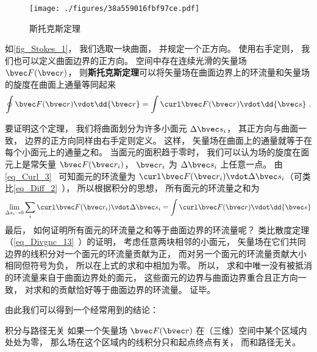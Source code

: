 
\begin{issues}
\issueTODO
\end{issues}


\begin{figure}[ht]
\centering
\texttt{[image: ./figures/38a559016fbf97ce.pdf]}
\caption{斯托克斯定理} \label{fig_Stokes_1}
\end{figure}

如\autoref{fig_Stokes_1}， 我们选取一块曲面， 并规定一个正方向。 使用右手定则， 我们也可以定义曲面边界的正方向。 空间中存在连续光滑的矢量场 $\bvec F(\bvec r)$， 则\textbf{斯托克斯定理}可以将矢量场在曲面边界上的环流量和矢量场的旋度在曲面上通量等同起来
\begin{equation}\label{eq_Stokes_1}
\oint \bvec F(\bvec r) \vdot \dd{\bvec r} = \int \curl \bvec F(\bvec r) \vdot \dd{\bvec s}~.
\end{equation}

要证明这个定理， 我们将曲面划分为许多小面元 $\Delta \bvec s_i$， 其正方向与曲面一致， 边界的正方向同样由右手定则定义。 这样， 矢量场在曲面上的通量就等于在每个小面元上的通量之和。 当面元的面积趋于零时， 我们可以认为场的旋度在面元上是常矢量 $\bvec F(\bvec r_i)$， $\bvec r_i$ 为 $\Delta \bvec s_i$ 上任意一点。 由\autoref{eq_Curl_3}~ 可知面元的环流量为 $\curl\bvec F(\bvec r_i) \vdot \Delta \bvec s_i$（可类比\autoref{eq_Diff_2}~）， 所以根据积分的思想， 所有面元的环流量之和为
\begin{equation}
\lim_{\Delta s_i \to 0}\sum_i \curl\bvec F(\bvec r_i) \vdot \Delta \bvec s_i = \int \curl\bvec F(\bvec r) \vdot \dd{\bvec s}
\end{equation}
最后， 如何证明所有面元的环流量之和等于曲面边界的环流量呢？ 类比散度定理（\autoref{eq_Divgnc_13}~）的证明， 考虑任意两块相邻的小面元， 矢量场在它们共同边界的线积分对一个面元的环流量贡献为正， 而对另一个面元的环流量贡献大小相同但符号为负， 所以在上式的求和中相加为零。 所以， 求和中唯一没有被抵消的环流量来自于曲面边界处的面元， 这些面元的边界与曲面边界重合且正方向一致， 对求和的贡献恰好等于曲面边界的环流量。 证毕。

由此我们可以得到一个经常用到的结论：
\begin{theorem}{积分与路径无关}
如果一个矢量场 $\bvec F(\bvec r)$ 在（三维）空间中某个区域内处处为零， 那么场在这个区域内的线积分只和起点终点有关， 而和路径无关。
\end{theorem}

